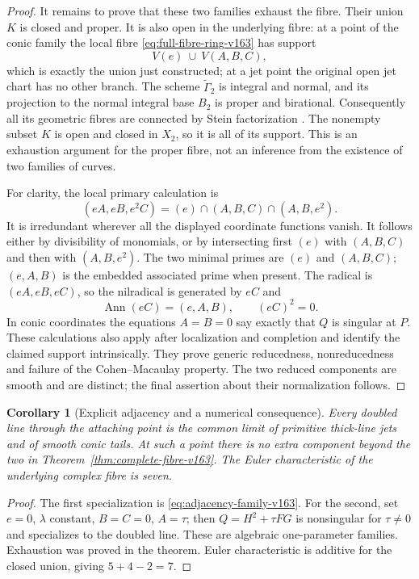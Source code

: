 \documentclass[11pt,reqno]{amsart}
\numberwithin{equation}{section}
\newtheorem{corollary}[theorem]{Corollary}
\theoremstyle{definition}\newtheorem{definition}[theorem]{Definition}
\theoremstyle{remark}\newtheorem{remark}[theorem]{Remark}
\begin{document}
\begin{proof}
It remains to prove that these two families exhaust the fibre.
Their union $K$ is closed and proper. It is also open in the
underlying fibre: at a point of the conic family the local fibre
\eqref{eq:full-fibre-ring-v163} has support
\[
                    V(e)\ \cup\ V(A,B,C),
\]
which is exactly the union just constructed; at a jet point the
original open jet chart has no other branch. The scheme
$\widetilde\Gamma_2$ is integral and normal, and its projection
to the normal integral base $B_2$ is proper and birational.
Consequently all its geometric fibres are connected by Stein
factorization \cite[Lemma~37.53.6]{Stacks163}. The nonempty subset
$K$ is open and closed in $X_2$, so it is all of its support.
This is an exhaustion argument for the proper fibre, not an
inference from the existence of two families of curves.

For clarity, the local primary calculation is
\begin{equation}\label{eq:primary-fibre-v163}
 (eA,eB,e^2C)=(e)\cap(A,B,C)\cap(A,B,e^2).
\end{equation}
It is irredundant wherever all the displayed coordinate functions
vanish. It follows either by divisibility of monomials, or by
intersecting first $(e)$ with $(A,B,C)$ and then with $(A,B,e^2)$.
The two minimal primes are $(e)$ and $(A,B,C)$; $(e,A,B)$ is the
embedded associated prime when present. The radical is
$(eA,eB,eC)$, so the nilradical is generated by $eC$ and
\[
              \operatorname{Ann}(eC)=(e,A,B),\qquad (eC)^2=0.
\]
In conic coordinates the equations $A=B=0$ say exactly that $Q$
is singular at $P$. These calculations also apply after localization
and completion and identify the claimed support intrinsically.
They prove generic reducedness, nonreducedness and failure of the
Cohen--Macaulay property. The two reduced components are smooth and
are distinct; the final assertion about their normalization follows.
\end{proof}

\begin{corollary}[Explicit adjacency and a numerical consequence]
\label{cor:adjacency-v163}
Every doubled line through the attaching point is the common limit of
primitive thick-line jets and of smooth conic tails. At such a point
there is no extra component beyond the two in
Theorem~\ref{thm:complete-fibre-v163}. The Euler characteristic of the
underlying complex fibre is seven.
\end{corollary}
\begin{proof}
The first specialization is \eqref{eq:adjacency-family-v163}. For the
second, set $e=0$, $\lambda$ constant, $B=C=0$, $A=\tau$; then
$Q=H^2+\tau FG$ is nonsingular for $\tau\ne0$ and specializes to
the doubled line. These are algebraic one-parameter families.
Exhaustion was proved in the theorem. Euler characteristic is
additive for the closed union, giving $5+4-2=7$.
\end{proof}
\end{document}
